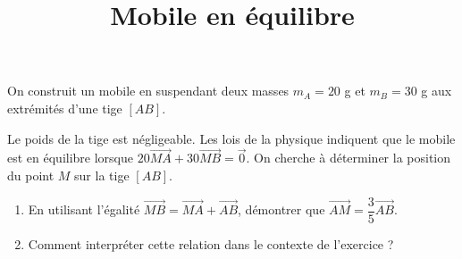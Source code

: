 \documentclass[
	classe=$2^{de}$
]{exercice}
\title{Mobile en équilibre}
\begin{document}
\maketitle

On construit un mobile en suspendant deux masses $m_A = 20$ g et $m_B = 30$ g aux extrémités d'une tige $[AB]$.

\begin{center}
\end{center}

Le poids de la tige est négligeable. Les lois de la physique indiquent que le mobile est en équilibre lorsque $20\vec{MA} + 30\vec{MB} = \vec{0}$. On cherche à déterminer la position du point $M$ sur la tige $[AB]$.

\begin{enumerate}
	\item En utilisant l'égalité $\vec{MB} = \vec{MA} + \vec{AB}$, démontrer que $\vec{AM} = \dfrac{3}{5}\vec{AB}$.

	\item Comment interpréter cette relation dans le contexte de l'exercice ?

\end{enumerate}
\end{document}
